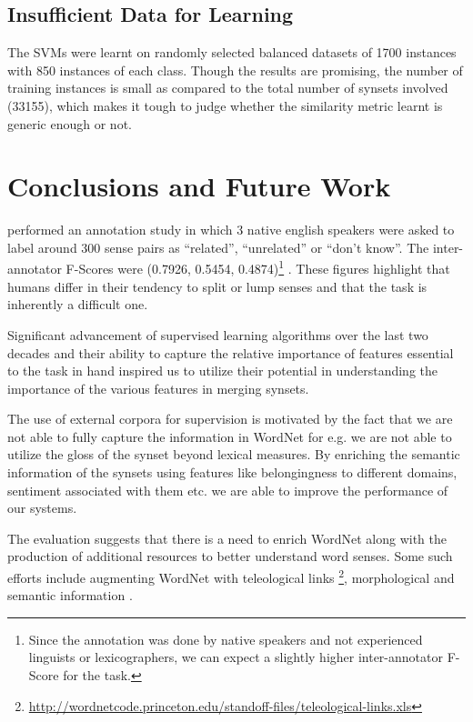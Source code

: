 \subsection{Insufficient Data for Learning}
The SVMs were learnt on randomly selected balanced datasets of 1700 instances with 850 instances of each class. Though the results are promising, the number of training instances is small as compared to the total number of synsets involved (33155), which makes it tough to judge whether the similarity metric learnt is generic enough or not.

\section{Conclusions and Future Work}
\citep{mccarthy2006relating} performed an annotation study in which 3 native english speakers were asked to label around 300 sense pairs as ``related'', ``unrelated'' or ``don't know''. The inter-annotator F-Scores were (0.7926, 0.5454, 0.4874)\footnote{Since the annotation was done by native speakers and not experienced linguists or lexicographers, we can expect a slightly higher inter-annotator F-Score for the task.} \citep{mccarthy2006relating} \citep{snow07mergesense}. These figures highlight that humans differ in their tendency to split or lump senses and that the task is inherently a difficult one.

Significant advancement of supervised learning algorithms over the last two decades and their ability to capture the relative importance of features essential to the task in hand inspired us to utilize their potential in understanding the importance of the various features in merging synsets.

The use of external corpora for supervision is motivated by the fact that we are not able to fully capture the information in WordNet for e.g. we are not able to utilize the gloss of the synset beyond lexical measures. By enriching the semantic information of the synsets using features like belongingness to different domains, sentiment associated with them etc. we are able to improve the performance of our systems. 

The evaluation suggests that there is a need to enrich WordNet along with the production of additional resources to better understand word senses. Some such efforts include augmenting WordNet with teleological links \footnote{\url{http://wordnetcode.princeton.edu/standoff-files/teleological-links.xls}}, morphological and semantic information \citep{morphosemanticLinks}. 
